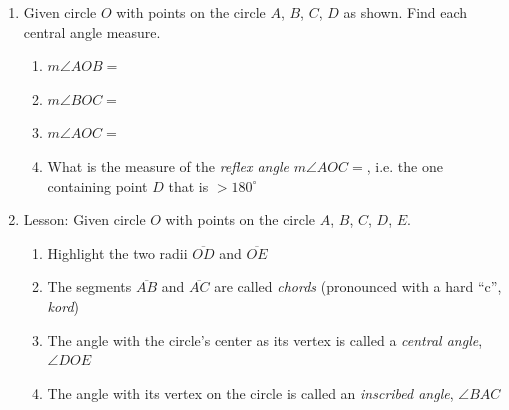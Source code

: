 \documentclass[12pt, twoside]{article}
\begin{document}
\begin{enumerate}
\newpage
\item Given circle $O$ with points on the circle $A$, $B$, $C$, $D$ as shown. Find each central angle measure.
  \begin{multicols}{2}
    \begin{enumerate} 
      \item $m\angle AOB =$
      \item $m\angle BOC =$
      \item $m\angle AOC =$
      \item What is the measure of the \emph{reflex angle} $m\angle AOC =$, i.e. the one containing point $D$ that is $>180^\circ$
      \end{enumerate}
  \end{multicols}

\newpage
\item Lesson: Given circle $O$ with points on the circle $A$, $B$, $C$, $D$, $E$.
    \begin{multicols}{2}
    \raggedcolumns
    \begin{enumerate}[itemsep=0.5cm]
      \item Highlight the two radii $\overline{OD}$ and $\overline{OE}$
      \item The segments $\overline{AB}$ and $\overline{AC}$ are called \emph{chords} (pronounced with a hard ``c'', \emph{kord})
      \item The angle with the circle's center as its vertex is called a \emph{central angle}, $\angle DOE$
      \item The angle with its vertex on the circle is called an \emph{inscribed angle}, $\angle BAC$
    \end{enumerate}
    \end{multicols}
    

\end{enumerate}
\end{document}

